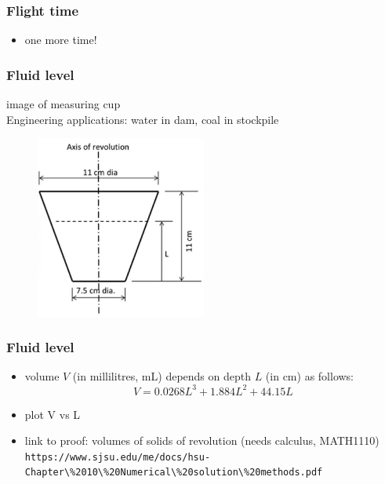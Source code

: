 \documentclass[english,14pt]{beamer}
\begin{document}

\begin{frame}[fragile]

\frametitle{Flight time}

\begin{itemize}
	\item one more time!
\end{itemize}

\end{frame}


\begin{frame}[fragile]

\frametitle{Fluid level}

image of measuring cup \\
Engineering applications: water in dam, coal in stockpile

\begin{figure}[ht]
	\centering
	\includegraphics[width=0.5\textwidth]{figures/cupDimensions}
\end{figure}

\end{frame}


\begin{frame}[fragile]

\frametitle{Fluid level}


\begin{itemize}
	\item volume $V$ (in millilitres, mL) depends on depth $L$ (in cm) as follows: %
	\[
		V = 0.0268L^3 + 1.884L^2 + 44.15L
	\]
	\item plot V vs L
	\item link to proof: volumes of solids of revolution (needs calculus, MATH1110) \verb+https://www.sjsu.edu/me/docs/hsu-Chapter\%2010\%20Numerical\%20solution\%20methods.pdf+
\end{itemize}

\end{frame}
\end{document}
